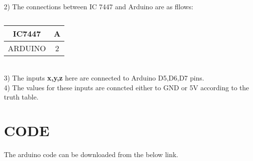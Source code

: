 \documentclass[a4paper,11pt,twocolumn]{article}
\begin{document}
2) The connections between IC 7447 and Arduino are as fllows:
\begin{table}[ht!] 
    \centering 
    \begin{tabular}{|c|c|} 
    \hline 
        IC7447&A  \\ 
         \hline 
         ARDUINO&2 \\ 
         \hline 
    \end{tabular} 
\caption{} 
\end{table} 
\\

3) The inputs \textbf{x,y,z} here are connected to Arduino D5,D6,D7 pins.\\

4) The values for these inputs are conncted either to GND or 5V according to the truth table.\\
\section{CODE}
\paragraph{}
	The arduino code can be downloaded from the below link.
\begin{center} 
\end{center}
\end{document}
